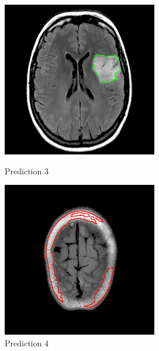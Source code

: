 \documentclass[11pt,a4paper]{article}
\begin{document}
\begin{figure}[H]
    \centering
    \begin{minipage}[t]{0.48\textwidth}
        \centering
        \includegraphics[width=\linewidth]{../predictions/kaggle_3m/TCGA_CS_6668_20011025-15.png}
        \caption{Prediction 3}
        \label{fig:img_3}
    \end{minipage}
    \hfill
    \begin{minipage}[t]{0.48\textwidth}
        \centering
        \includegraphics[width=\linewidth]{../predictions/kaggle_3m/TCGA_CS_6668_20011025-23.png}
        \caption{Prediction 4}
        \label{fig:img_4}
    \end{minipage}
\end{figure}
\end{document}
